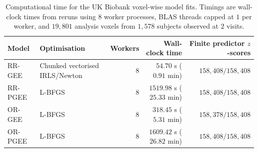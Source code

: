 \begin{table}[htbp]
\centering
\caption{Computational time for the UK Biobank voxel-wise model fits. Timings are wall-clock times from reruns using $8$ worker processes, BLAS threads capped at $1$ per worker, and $19{,}801$ analysis voxels from $1{,}578$ subjects observed at $2$ visits.}
\label{tab:ukb-computational-time}
\setlength{\tabcolsep}{5pt}
\renewcommand{\arraystretch}{1.12}
\begin{tabular}{llrrr}
\toprule
Model & Optimisation & Workers & Wall-clock time & Finite predictor $z$-scores \\
\midrule
RR-GEE & Chunked vectorised IRLS/Newton & $8$ & $54.70$ s ($0.91$ min) & $158{,}408/158{,}408$ \\
RR-PGEE & L-BFGS & $8$ & $1519.98$ s ($25.33$ min) & $158{,}408/158{,}408$ \\
OR-GEE & L-BFGS & $8$ & $318.45$ s ($5.31$ min) & $158{,}378/158{,}408$ \\
OR-PGEE & L-BFGS & $8$ & $1609.42$ s ($26.82$ min) & $158{,}408/158{,}408$ \\
\bottomrule
\end{tabular}
\end{table}

